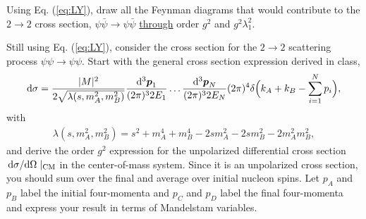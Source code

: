 {\begin{parts}
\item Using Eq. (\ref{eq:LY}), draw all the Feynman diagrams that would contribute to the $2 \rightarrow 2$ cross section, $\psi \bar{\psi} \rightarrow \psi \bar{\psi}$ \underline{through} order $g^2$ and $g^2 \lambda_1^2$.

\item Still using Eq. (\ref{eq:LY}), consider the cross section for the $2 \rightarrow 2$ scattering process $\psi \psi \rightarrow \psi \psi$.
    Start with the general cross section expression derived in class,
    \begin{align}
        \dd{\sigma} = \frac{|M|^2}{2 \sqrt{\lambda(s,m_{A}^2,m_{B}^2)}} \frac{\dd[3]{\vb*{p}_{1}}}{(2 \pi)^3 2 E_{1}} \ldots \frac{\dd[3]{\vb*{p}_{N}}}{(2 \pi)^3 2 E_{N}} (2 \pi)^{4} \delta\Big( k_{A} + k_{B} - \sum_{i=1}^{N} p_{i} \Big)
    ,\end{align}
    with
    \begin{align}
        \lambda(s,m_{A}^2,m_{B}^2) = s^2 + m_{A}^{4} + m_{B}^{4} - 2 s m_{A}^2 - 2 s m_{B}^2 - 2 m_{A}^2 m_{B}^2
    ,\end{align}
    and derive the order $g^2$ expression for the unpolarized differential cross section $\dv*{\sigma}{\Omega}|_{\rm CM}$ in the center-of-mass system.
    Since it is an unpolarized cross section, you should sum over the final and average over initial nucleon spins.
    Let $p_{A}$ and $p_{B}$ label the initial four-momenta and $p_{C}$ and $p_{D}$ label the final four-momenta and express your result in terms of Mandelstam variables.
    
\end{parts}

}
    

